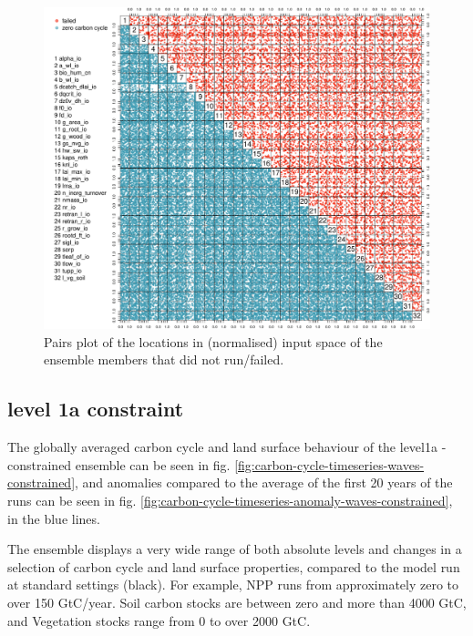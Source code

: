 \documentclass[gmd, manuscript]{copernicus}
\begin{document}


\begin{figure}[t]
\includegraphics[width=12cm]{./figs/run-failure-pairs.pdf}
\caption{Pairs plot of the locations in (normalised) input space of the ensemble members that did not run/failed.}
\label{fig:run-failure-pairs}
\end{figure}


\subsection{level 1a constraint}\label{sssec:level1a}

The globally averaged carbon cycle and land surface behaviour of the level1a - constrained ensemble can be seen in fig. \ref{fig:carbon-cycle-timeseries-waves-constrained}, and anomalies compared to the average of the first 20 years of the runs can be seen in fig. \ref{fig:carbon-cycle-timeseries-anomaly-waves-constrained}, in the blue lines.

The ensemble displays a very wide range of both absolute levels and changes in a selection of carbon cycle and land surface properties, compared to the model run at standard settings (black). For example, NPP runs from approximately zero to over 150 GtC/year. Soil carbon stocks are between zero and more than 4000 GtC, and Vegetation stocks range from 0 to over 2000 GtC.
\end{document}
